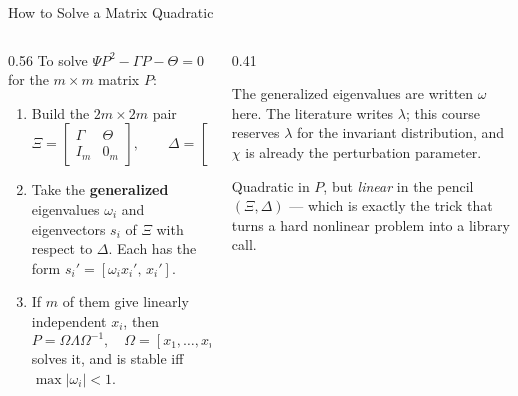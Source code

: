 \begin{frame}{How to Solve a Matrix Quadratic}
\begin{columns}[T]
\begin{column}{0.56\textwidth}
\small
To solve $\Psi P^{2}-\Gamma P-\Theta=0$ for the $m\times m$ matrix $P$:
\medskip
\begin{enumerate}\small
  \item Build the $2m\times 2m$ pair
  \[
    \Xi=\begin{bmatrix}\Gamma & \Theta\\ I_m & 0_m\end{bmatrix},
    \qquad
    \Delta=\begin{bmatrix}\Psi & 0_m\\ 0_m & I_m\end{bmatrix}.
  \]
  \item Take the \textbf{generalized} eigenvalues $\omega_i$ and eigenvectors $s_i$ of $\Xi$ with respect to $\Delta$. Each has the form $s_i'=[\omega_i x_i',\,x_i']$.
  \item If $m$ of them give linearly independent $x_i$, then
  \[
    P=\Omega\Lambda\Omega^{-1},\quad \Omega=[x_1,\dots,x_m],\ \Lambda=\mathrm{diag}(\omega_i),
  \]
  solves it, and is stable iff $\max|\omega_i|<1$.
\end{enumerate}
\end{column}
\begin{column}{0.41\textwidth}
\begin{conceptbox}[title=\textbf{Note the symbol}]\small
The generalized eigenvalues are written $\omega$ here. The literature writes $\lambda$; this course reserves $\lambda$ for the invariant distribution, and $\chi$ is already the perturbation parameter.
\end{conceptbox}
\medskip
\begin{examplebox}\footnotesize
Quadratic in $P$, but \emph{linear} in the pencil $(\Xi,\Delta)$ --- which is exactly the trick that turns a hard nonlinear problem into a library call.
\end{examplebox}
\end{column}
\end{columns}
\vspace{1mm}
\end{frame}

